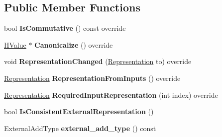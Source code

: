 \subsection*{Public Member Functions}
\begin{DoxyCompactItemize}
\item 
bool {\bfseries Is\+Commutative} () const  override\hypertarget{classv8_1_1internal_1_1_h_add_a05a5719e875e1a0cd785490eb103ef43}{}\label{classv8_1_1internal_1_1_h_add_a05a5719e875e1a0cd785490eb103ef43}

\item 
\hyperlink{classv8_1_1internal_1_1_h_value}{H\+Value} $\ast$ {\bfseries Canonicalize} () override\hypertarget{classv8_1_1internal_1_1_h_add_a78eeca04ffa33eacc734861a5e23bedf}{}\label{classv8_1_1internal_1_1_h_add_a78eeca04ffa33eacc734861a5e23bedf}

\item 
void {\bfseries Representation\+Changed} (\hyperlink{classv8_1_1internal_1_1_representation}{Representation} to) override\hypertarget{classv8_1_1internal_1_1_h_add_a8c677d54da6e87380f621e60106c5e12}{}\label{classv8_1_1internal_1_1_h_add_a8c677d54da6e87380f621e60106c5e12}

\item 
\hyperlink{classv8_1_1internal_1_1_representation}{Representation} {\bfseries Representation\+From\+Inputs} () override\hypertarget{classv8_1_1internal_1_1_h_add_a7948f4d0bcd7a101cccc52d652a9507f}{}\label{classv8_1_1internal_1_1_h_add_a7948f4d0bcd7a101cccc52d652a9507f}

\item 
\hyperlink{classv8_1_1internal_1_1_representation}{Representation} {\bfseries Required\+Input\+Representation} (int index) override\hypertarget{classv8_1_1internal_1_1_h_add_a3884e79f9840e99512837fa9ff895fad}{}\label{classv8_1_1internal_1_1_h_add_a3884e79f9840e99512837fa9ff895fad}

\item 
bool {\bfseries Is\+Consistent\+External\+Representation} ()\hypertarget{classv8_1_1internal_1_1_h_add_a1a42ec20063e1839cea8fa529f8346ec}{}\label{classv8_1_1internal_1_1_h_add_a1a42ec20063e1839cea8fa529f8346ec}

\item 
External\+Add\+Type {\bfseries external\+\_\+add\+\_\+type} () const \hypertarget{classv8_1_1internal_1_1_h_add_a4d068ccd435b48798893ff38b87ac7d7}{}\label{classv8_1_1internal_1_1_h_add_a4d068ccd435b48798893ff38b87ac7d7}

\end{DoxyCompactItemize}
